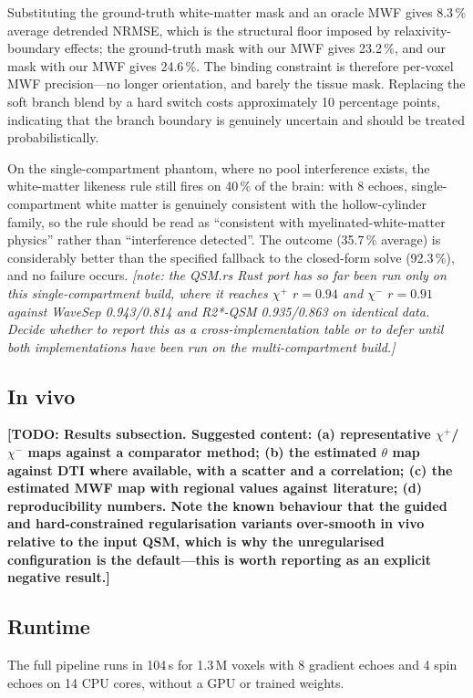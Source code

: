 \documentclass[AMA,STIX2COL,Linenumberson]{MRM}
\newcommand{\TODO}[1]{{\color{red}\textbf{[TODO: #1]}}}
\newcommand{\NOTE}[1]{{\color{blue}\small\textit{[note: #1]}}}
\newcommand{\TODO}[1]{}
\newcommand{\NOTE}[1]{}
\begin{document}
Substituting the ground-truth white-matter mask and an oracle MWF gives 8.3\,\% average detrended NRMSE, which is the structural floor imposed by relaxivity-boundary effects; the ground-truth mask with our MWF gives 23.2\,\%, and our mask with our MWF gives 24.6\,\%. The binding constraint is therefore per-voxel MWF precision---no longer orientation, and barely the tissue mask. Replacing the soft branch blend by a hard switch costs approximately 10 percentage points, indicating that the branch boundary is genuinely uncertain and should be treated probabilistically.

On the single-compartment phantom, where no pool interference exists, the white-matter likeness rule still fires on 40\,\% of the brain: with 8 echoes, single-compartment white matter is genuinely consistent with the hollow-cylinder family, so the rule should be read as ``consistent with myelinated-white-matter physics'' rather than ``interference detected''. The outcome (35.7\,\% average) is considerably better than the specified fallback to the closed-form solve (92.3\,\%), and no failure occurs. \NOTE{the QSM.rs Rust port has so far been run only on this single-compartment build, where it reaches $\chi^{+}$ $r=0.94$ and $\chi^{-}$ $r=0.91$ against WaveSep 0.943/0.814 and R2*-QSM 0.935/0.863 on identical data. Decide whether to report this as a cross-implementation table or to defer until both implementations have been run on the multi-compartment build.}

\subsection{In vivo}

\TODO{Results subsection. Suggested content: (a) representative $\chi^{+}$/$\chi^{-}$ maps against a comparator method; (b) the estimated $\theta$ map against DTI where available, with a scatter and a correlation; (c) the estimated MWF map with regional values against literature; (d) reproducibility numbers. Note the known behaviour that the guided and hard-constrained regularisation variants over-smooth in vivo relative to the input QSM, which is why the unregularised configuration is the default---this is worth reporting as an explicit negative result.}

\subsection{Runtime}

The full pipeline runs in 104\,s for 1.3\,M voxels with 8 gradient echoes and 4 spin echoes on 14 CPU cores, without a GPU or trained weights.
\end{document}
